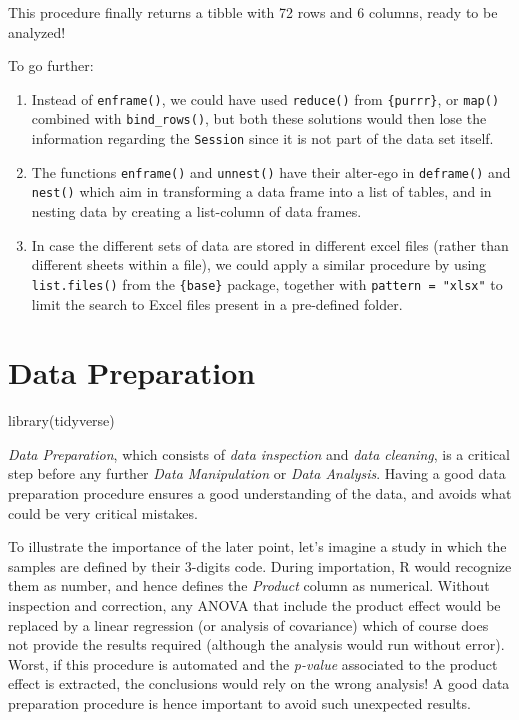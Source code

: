 \documentclass[
]{book}
\newenvironment{Shaded}{\begin{snugshade}}{\end{snugshade}}
\newcommand{\FunctionTok}[1]{\textcolor[rgb]{0.00,0.00,0.00}{#1}}
\newcommand{\NormalTok}[1]{#1}
\providecommand{\tightlist}{%
  \setlength{\itemsep}{0pt}\setlength{\parskip}{0pt}}
\begin{document}
This procedure finally returns a tibble with 72 rows and 6 columns, ready to be analyzed!

To go further:

\begin{enumerate}
\def\labelenumi{\arabic{enumi}.}
\tightlist
\item
  Instead of \texttt{enframe()}, we could have used \texttt{reduce()} from \texttt{\{purrr\}}, or \texttt{map()} combined with \texttt{bind\_rows()}, but both these solutions would then lose the information regarding the \texttt{Session} since it is not part of the data set itself.
\item
  The functions \texttt{enframe()} and \texttt{unnest()} have their alter-ego in \texttt{deframe()} and \texttt{nest()} which aim in transforming a data frame into a list of tables, and in nesting data by creating a list-column of data frames.
\item
  In case the different sets of data are stored in different excel files (rather than different sheets within a file), we could apply a similar procedure by using \texttt{list.files()} from the \texttt{\{base\}} package, together with \texttt{pattern\ =\ "xlsx"} to limit the search to Excel files present in a pre-defined folder.
\end{enumerate}

\hypertarget{data-prep}{%
\chapter{Data Preparation}\label{data-prep}}

\begin{Shaded}
\begin{Highlighting}[]
\FunctionTok{library}\NormalTok{(tidyverse)}
\end{Highlighting}
\end{Shaded}

\emph{Data Preparation}, which consists of \emph{data inspection} and \emph{data cleaning}, is a critical step before any further \emph{Data Manipulation} or \emph{Data Analysis}. Having a good data preparation procedure ensures a good understanding of the data, and avoids what could be very critical mistakes.

To illustrate the importance of the later point, let's imagine a study in which the samples are defined by their 3-digits code.
During importation, R would recognize them as number, and hence defines the \emph{Product} column as numerical. Without inspection and correction, any ANOVA that include the product effect would be replaced by a linear regression (or analysis of covariance) which of course does not provide the results required (although the analysis would run without error). Worst, if this procedure is automated and the \emph{p-value} associated to the product effect is extracted, the conclusions would rely on the wrong analysis! A good data preparation procedure is hence important to avoid such unexpected results.
\end{document}
